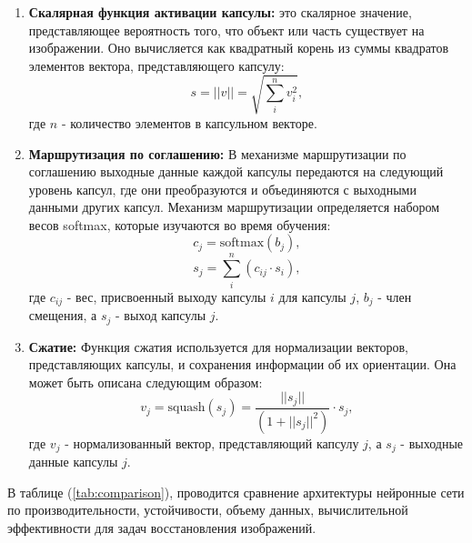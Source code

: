 \begin{enumerate}
	\item \textbf{Скалярная функция активации капсулы:} это скалярное значение, представляющее вероятность того, что объект или часть существует на изображении. Оно вычисляется как квадратный корень из суммы квадратов элементов вектора, представляющего капсулу:
		\begin{equation}
			s = ||v|| = \sqrt{\sum_{i}^{n} v_{i}^{2}},
		\end{equation}
		где \(n\) - количество элементов в капсульном векторе.

	\item \textbf{Маршрутизация по соглашению:} В механизме маршрутизации по соглашению выходные данные каждой капсулы передаются на следующий уровень капсул, где они преобразуются и объединяются с выходными данными других капсул. Механизм маршрутизации определяется набором весов softmax, которые изучаются во время обучения:
		\begin{equation}
			c_{j} = \text{softmax}(b_{j}),
		\end{equation}
		\begin{equation}
			s_{j} = \sum_{i}^{n}(c_{ij} \cdot s_{i}),
		\end{equation}
   		где \(c_{ij}\) - вес, присвоенный выходу капсулы \(i\) для капсулы \(j\), \(b_{j}\) - член смещения, а \(s_{j}\) - выход капсулы \(j\).

	\item \textbf{Сжатие:} Функция сжатия используется для нормализации векторов, представляющих капсулы, и сохранения информации об их ориентации. Она может быть описана следующим образом:
		\begin{equation}
			v_{j} = \text{squash}(s_{j}) = \frac{||s_{j}||}{(1 + ||s_{j}||^{2})} \cdot s_{j},
		\end{equation}
   		где \(v_{j}\) - нормализованный вектор, представляющий капсулу \(j\), а \(s_{j}\) - выходные данные капсулы \(j\).
\end{enumerate}

В таблице (\ref{tab:comparison}), проводится сравнение архитектуры нейронные сети по производительности, устойчивости, объему данных, вычислительной эффективности для задач восстановления изображений. 

